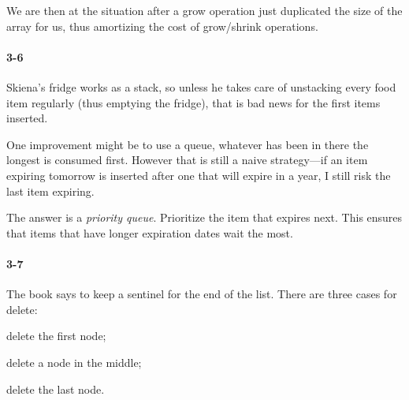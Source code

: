 \documentclass{report}
\begin{document}
\begin{enumerate}[label=\alph*)]
        \begin{center}
        \end{center}

        We are then at the situation after a grow operation just duplicated the size of the array for us, thus amortizing the cost of grow/shrink operations.
\end{enumerate}

\paragraph{3-6}Skiena's fridge works as a stack, so unless he takes care of unstacking every food item regularly (thus emptying the fridge), that is bad news for the first items inserted.

One improvement might be to use a queue, whatever has been in there the longest is consumed first. However that is still a naive strategy---if an item expiring tomorrow is inserted after one that will expire in a year, I still risk the last item expiring.

The answer is a \emph{priority queue}. Prioritize the item that expires next. This ensures that items that have longer expiration dates wait the most.

\paragraph{3-7} The book says to keep a sentinel for the end of the list. There are three cases for delete: \begin{enumerate*}[label=\arabic*)]\item delete the first node; \item delete a node in the middle; \item delete the last node.\end{enumerate*}
\end{document}
